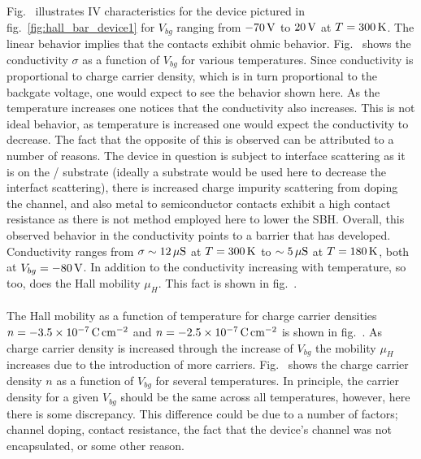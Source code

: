 \noindent Fig.~ illustrates IV characteristics for the device pictured in fig.~\ref{fig:hall_bar_device1} for $V_{bg}$ ranging from $-70\,\mathrm{V}$ to $20\,\mathrm{V}$ at $T=300\,\mathrm{K}$. The linear behavior implies that the contacts exhibit ohmic behavior. Fig.~ shows the conductivity $\sigma$ as a function of $V_{bg}$ for various temperatures. Since conductivity is proportional to charge carrier density, which is in turn proportional to the backgate voltage, one would expect to see the behavior shown here. As the temperature increases one notices that the conductivity also increases. This is not ideal behavior, as temperature is increased one would expect the conductivity to decrease. The fact that the opposite of this is observed can be attributed to a number of reasons. The device in question is subject to interface scattering as it is on the / substrate (ideally a \hbn substrate would be used here to decrease the interfact scattering), there is increased charge impurity scattering from doping the channel, and also metal to semiconductor contacts exhibit a high contact resistance as there is not method employed here to lower the \acs{SBH}. Overall, this observed behavior in the conductivity points to a barrier that has developed. Conductivity ranges from $\sigma\sim 12\,\mathrm{\mu S}$ at $T=300\,\mathrm{K}$ to $\sim 5\,\mathrm{\mu S}$ at $T=180\,\mathrm{K}$, both at $V_{bg}=-80\,\mathrm{V}$. In addition to the conductivity increasing with temperature, so too, does the Hall mobility $\mu_H$. This fact is shown in fig.~. \\ \\

\noindent The Hall mobility as a function of temperature for charge carrier densities $n=-3.5\times 10^{-7}\,\mathrm{C}\,\mathrm{cm}^{-2}$ and $n=-2.5\times 10^{-7}\,\mathrm{C}\,\mathrm{cm}^{-2}$ is shown in fig.~. As charge carrier density is increased through the increase of $V_{bg}$ the mobility $\mu_H$ increases due to the introduction of more carriers. Fig.~ shows the charge carrier density $n$ as a function of $V_{bg}$ for several temperatures. In principle, the carrier density for a given $V_{bg}$ should be the same across all temperatures, however, here there is some discrepancy. This difference could be due to a number of factors; channel doping, contact resistance, the fact that the device's channel was not encapsulated, or some other reason. \\ \\ 

